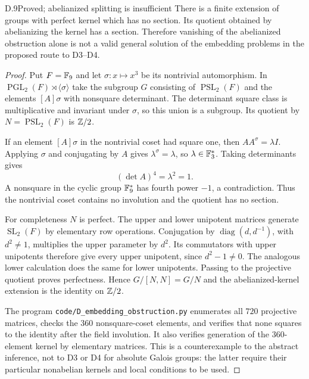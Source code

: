 \begin{claim}{D.9}{Proved; abelianized splitting is insufficient}
There is a finite extension of groups with perfect kernel which
has no section. Its quotient obtained by abelianizing the kernel
has a section. Therefore vanishing of the abelianized obstruction
alone is not a valid general solution of the embedding problems
in the proposed route to D3--D4.
\end{claim}
\begin{proof}
Put $F=\mathbb F_9$ and let $\sigma:x\mapsto x^3$ be its nontrivial
automorphism. In $\operatorname{PGL}_2(F)\rtimes\langle\sigma\rangle$
take the subgroup $G$ consisting of $\operatorname{PSL}_2(F)$
and the elements $[A]\sigma$ with nonsquare determinant.
The determinant square class is multiplicative and invariant
under $\sigma$, so this union is a subgroup. Its quotient by
$N=\operatorname{PSL}_2(F)$ is $\mathbb Z/2$.

If an element $[A]\sigma$ in the nontrivial coset had square one,
then $A A^\sigma=\lambda I$. Applying $\sigma$ and conjugating
by $A$ gives $\lambda^\sigma=\lambda$, so
$\lambda\in\mathbb F_3^*$. Taking determinants gives
\[
              (\det A)^4=\lambda^2=1.
\]
A nonsquare in the cyclic group $\mathbb F_9^*$ has fourth power
$-1$, a contradiction. Thus the nontrivial coset contains no
involution and the quotient has no section.

For completeness $N$ is perfect. The upper and lower unipotent
matrices generate $\operatorname{SL}_2(F)$ by elementary row
operations. Conjugation by $\operatorname{diag}(d,d^{-1})$,
with $d^2\ne1$, multiplies the upper parameter by $d^2$.
Its commutators with upper unipotents therefore give every upper
unipotent, since $d^2-1\ne0$. The analogous lower calculation
does the same for lower unipotents. Passing to the projective
quotient proves perfectness. Hence $G/[N,N]=G/N$ and the
abelianized-kernel extension is the identity on $\mathbb Z/2$.

The program \texttt{code/D\_embedding\_obstruction.py}
enumerates all $720$ projective matrices, checks the $360$
nonsquare-coset elements, and verifies that none squares to the
identity after the field involution. It also verifies generation
of the $360$-element kernel by elementary matrices. This is a
counterexample to the abstract inference, not to D3 or D4 for
absolute Galois groups: the latter require their particular
nonabelian kernels and local conditions to be used.
\end{proof}



